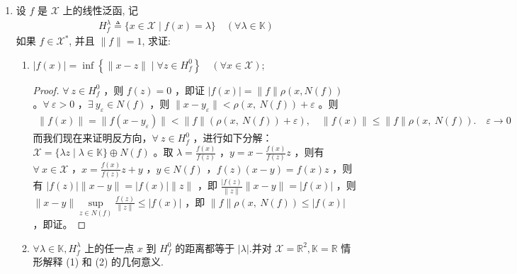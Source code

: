 \begin{enumerate}[leftmargin=2cm, label=\arabic*]
\begin{enumerate}[leftmargin=1cm, label=(\arabic*)]
        \begin{align*}
            f \in \mathscr{X}^{*} \Longleftrightarrow N(f) \text { 是闭线性子空间. }
        \end{align*}
\begin{proof}
    必要性由 (1) 已经证明，我们来证明充分性。利用反证法，若 $\forall\ x_n$ ，$\|x_n\| = 1$ ，$|f(x_n)| \geqslant n$ ，$y_n = \frac{x_n}{f(x_n)} - \frac{x_1}{f(x_1)}$ ，则有 $y_n = 0$ 进而推出 $y_n\in N(f)$ ，但是 $y_n\to -\frac{x_1}{f(x_1} \notin N(f)$ 与闭空间矛盾。
\end{proof}
    \end{enumerate}
    \item 设 $f$ 是 $\mathscr{X}$ 上的线性泛函, 记
    \begin{align*}
        H_{f}^{\lambda} \triangleq\{x \in \mathscr{X} \mid f(x)=\lambda\} \quad(\forall \lambda \in \mathbb{K})
    \end{align*}
    如果 $f \in \mathscr{X}^{*}$, 并且 $\|f\|=1$, 求证:
    \begin{enumerate}[leftmargin=1cm, label=(\arabic*)]
        \item $|f(x)|=\inf \left\{\|x-z\| \mid \forall z \in H_{f}^{0}\right\} \quad(\forall x \in \mathscr{X})$;
\begin{proof}
    $\forall\ z\in H_f^0$ ，则 $f(z) = 0$ ，即证 $|f(x)| = \|f\|\rho(x, N(f))$ 。$\forall\ \varepsilon>0$ ，$\exists\ y_{\varepsilon}\in N(f)$ ，则 $\|x-y_{\varepsilon}\| < \rho(x,\ N(f)) + \varepsilon$ 。则
\begin{align*}
    \|f(x)\| = \|f(x-y_{\varepsilon})\| < \|f\|\left(\rho(x,\ N(f)) + \varepsilon \right), \quad \|f(x)\| \leqslant \|f\| \rho(x,\ N(f)).\quad \varepsilon \to 0
\end{align*}
而我们现在来证明反方向，$\forall\ z\in H_f^0$ ，进行如下分解：$\mathscr{X} = \{\lambda z\mid \lambda\in \mathbb{K}\} \oplus N(f)$ 。取 $\lambda = \frac{f(x)}{f(z)}$ ，$y = x - \frac{f(x)}{f(z)}z$ ，则有 $\forall\ x\in \mathscr{X}$ ，$x = \frac{f(x)}{f(z)} z + y$ ，$y\in N(f)$ ，$f(z)(x-y) = f(x)z$ ，则有 $|f(z)|\|x-y\| = |f(x)|\|z\|$ ，即 $\frac{|f(z)}{\|z\|} \|x-y\| = |f(x)|$ ，则 $\|x-y\| \sup\limits_{z\in N(f)} \frac{f(z)}{\|z\|} \leqslant |f(x)|$ ，即 $\|f\|\rho(x,\ N(f)) \leqslant |f(x)|$ ，即证。
\end{proof}
        \item $\forall \lambda \in \mathbb{K}, H_{f}^{\lambda}$ 上的任一点 $x$ 到 $H_{f}^{0}$ 的距离都等于 $|\lambda|$.并对 $\mathscr{X}=\mathbb{R}^{2}, \mathbb{K}=\mathbb{R}$ 情形解释 (1) 和 (2) 的几何意义.

\end{enumerate}
\end{enumerate}
